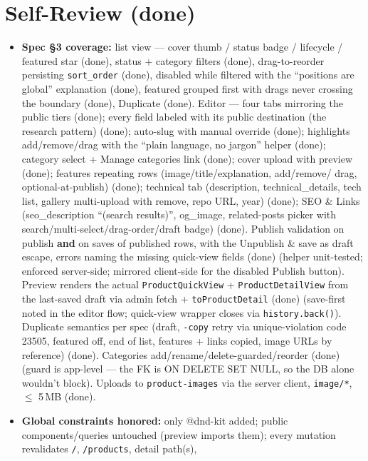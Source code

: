 \documentclass[11pt,a4paper]{article}
\begin{document}
\section{Self-Review (done)}
\begin{itemize}
  \item \textbf{Spec \S3 coverage:} list view --- cover thumb / status badge / lifecycle / featured star
        (done), status + category filters (done), drag-to-reorder persisting \texttt{sort\_order} (done),
        disabled while filtered with the ``positions are global'' explanation (done), featured grouped
        first with drags never crossing the boundary (done), Duplicate (done). Editor --- four tabs
        mirroring the public tiers (done); every field labeled with its public destination (the research
        pattern) (done); auto-slug with manual override (done); highlights add/remove/drag with the
        ``plain language, no jargon'' helper (done); category select + Manage categories link (done);
        cover upload with preview (done); features repeating rows (image/title/explanation, add/remove/
        drag, optional-at-publish) (done); technical tab (description, technical\_details, tech list,
        gallery multi-upload with remove, repo URL, year) (done); SEO \& Links (seo\_description
        ``(search results)'', og\_image, related-posts picker with search/multi-select/drag-order/draft
        badge) (done). Publish validation on publish \textbf{and} on saves of published rows, with the
        Unpublish \& save as draft escape, errors naming the missing quick-view fields (done) (helper
        unit-tested; enforced server-side; mirrored client-side for the disabled Publish button). Preview
        renders the actual \texttt{ProductQuickView} + \texttt{ProductDetailView} from the last-saved
        draft via admin fetch + \texttt{toProductDetail} (done) (save-first noted in the editor flow;
        quick-view wrapper closes via \texttt{history.back()}). Duplicate semantics per spec (draft,
        \texttt{-copy} retry via unique-violation code 23505, featured off, end of list, features + links
        copied, image URLs by reference) (done). Categories add/rename/delete-guarded/reorder (done)
        (guard is app-level --- the FK is ON DELETE SET NULL, so the DB alone wouldn't block). Uploads to
        \texttt{product-images} via the server client, \texttt{image/*}, $\leq$ 5\,MB (done).
  \item \textbf{Global constraints honored:} only @dnd-kit added; public components/queries untouched
        (preview imports them); every mutation revalidates \texttt{/}, \texttt{/products}, detail path(s),

\end{itemize}
\end{document}
